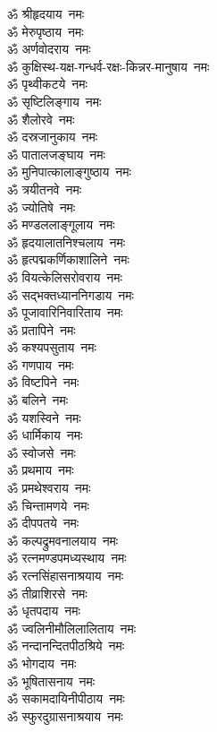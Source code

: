 \begin{multicols}{2}
\begin{flushleft}
ॐ श्रीहृदयाय~नमः\\
ॐ मेरुपृष्ठाय~नमः\\
ॐ अर्णवोदराय~नमः\hfill{}\\
ॐ कुक्षिस्थ-यक्ष-गन्धर्व-रक्षः-किन्नर-मानुषाय~नमः\\
ॐ पृथ्वीकटये~नमः\\
ॐ सृष्टिलिङ्गाय~नमः\\
ॐ शैलोरवे~नमः\\
ॐ दस्रजानुकाय~नमः\\
ॐ पातालजङ्घाय~नमः\\
ॐ मुनिपात्कालाङ्गुष्ठाय~नमः\\
ॐ त्रयीतनवे~नमः\\
ॐ ज्योतिषे~नमः\\
ॐ मण्डललाङ्गूलाय~नमः\hfill{}\\
ॐ हृदयालातनिश्चलाय~नमः\\
ॐ हृत्पद्मकर्णिकाशालिने~नमः\\
ॐ वियत्केलिसरोवराय~नमः\\
ॐ सद्भक्तध्याननिगडाय~नमः\\
ॐ पूजावारिनिवारिताय~नमः\\
ॐ प्रतापिने~नमः\\
ॐ कश्यपसुताय~नमः\\
ॐ गणपाय~नमः\\
ॐ विष्टपिने~नमः\\
ॐ बलिने~नमः\hfill{}\\
ॐ यशस्विने~नमः\\
ॐ धार्मिकाय~नमः\\
ॐ स्वोजसे~नमः\\
ॐ प्रथमाय~नमः\\
ॐ प्रमथेश्वराय~नमः\\
ॐ चिन्तामणये~नमः\\
ॐ दीपपतये~नमः\\
ॐ कल्पद्रुमवनालयाय~नमः\\
ॐ रत्नमण्डपमध्यस्थाय~नमः\\
ॐ रत्नसिंहासनाश्रयाय~नमः\hfill{}\\
ॐ तीव्राशिरसे~नमः\\
ॐ धृतपदाय~नमः\\
ॐ ज्वलिनीमौलिलालिताय~नमः\\
ॐ नन्दानन्दितपीठश्रिये~नमः\\
ॐ भोगदाय~नमः\\
ॐ भूषितासनाय~नमः\\
ॐ सकामदायिनीपीठाय~नमः\\
ॐ स्फुरदुग्रासनाश्रयाय~नमः\\

\end{flushleft}
\end{multicols}
